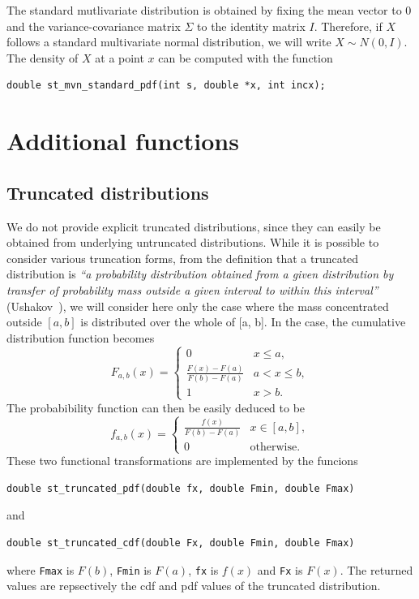 The standard mutlivariate distribution is obtained by fixing the mean
vector to 0 and the variance-covariance matrix $\Sigma$ to the
identity matrix $I$.
Therefore, if $X$ follows a standard multivariate normal distribution,
we will write $X \sim N(0,I)$.
The density of $X$ at a point $x$ can be computed with the function
\begin{verbatim}
double st_mvn_standard_pdf(int s, double *x, int incx);
\end{verbatim}

\section{Additional functions}

\subsection{Truncated distributions}

We do not provide explicit truncated distributions, since they can
easily be obtained from underlying untruncated distributions.
While it is possible to consider various truncation forms, from the
definition that a truncated distribution is {\em ``a probability
  distribution obtained from a given distribution by transfer of
  probability mass outside a given interval to within this interval''}
(Ushakov~\cite{Usha01}), we will consider here only the case where the
mass concentrated outside $[a, b]$ is distributed over the whole of
[a, b].
In the case, the cumulative distribution function becomes
\[
F_{a,b}(x) = \begin{cases}
0 & x \leq a, \\
\frac{F(x)-F(a)}{F(b)-F(a)} & a < x \leq b,\\
1 & x > b.
\end{cases}
\]
The probabibility function can then be easily deduced to be
\[
f_{a,b}(x) =
\begin{cases}
\frac{f(x)}{F(b)-F(a)} & x \in [a,b],\\
0 & \mbox{otherwise.}
\end{cases}
\]
These two functional transformations are implemented by the funcions
\begin{verbatim}
double st_truncated_pdf(double fx, double Fmin, double Fmax)
\end{verbatim}
and
\begin{verbatim}
double st_truncated_cdf(double Fx, double Fmin, double Fmax)
\end{verbatim}
where \verb|Fmax| is $F(b)$, \verb|Fmin| is $F(a)$, \verb|fx| is
$f(x)$ and \verb|Fx| is $F(x)$.
The returned values are repsectively the cdf and pdf values of the
truncated distribution.


